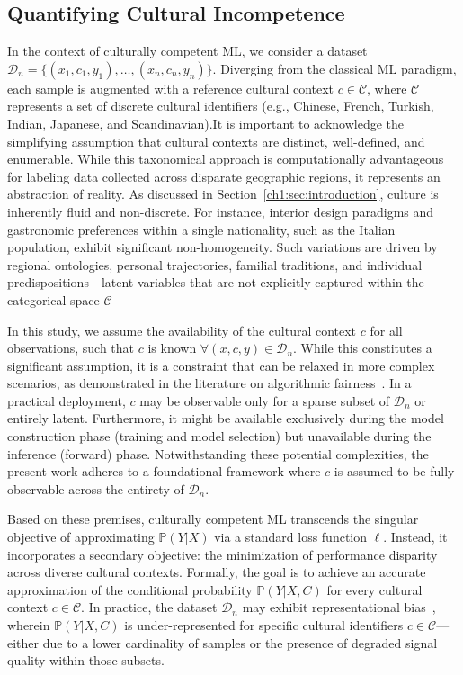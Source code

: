 \subsection{Quantifying Cultural Incompetence}
\label{ch2:sec:CCML}
In the context of culturally competent ML, we consider a dataset $\mathcal{D}_n = \{ (x_1, c_1, y_1), \dots, (x_n, c_n, y_n) \}$. 
Diverging from the classical ML paradigm, each sample is augmented with a reference cultural context $c \in \mathcal{C}$, where $\mathcal{C}$ represents a set of discrete cultural identifiers (e.g., Chinese, French, Turkish, Indian, Japanese, and Scandinavian).It is important to acknowledge the simplifying assumption that cultural contexts are distinct, well-defined, and enumerable. 
While this taxonomical approach is computationally advantageous for labeling data collected across disparate geographic regions, it represents an abstraction of reality. 
As discussed in Section~\ref{ch1:sec:introduction}, culture is inherently fluid and non-discrete. 
For instance, interior design paradigms and gastronomic preferences within a single nationality, such as the Italian population, exhibit significant non-homogeneity. 
Such variations are driven by regional ontologies, personal trajectories, familial traditions, and individual predispositions—latent variables that are not explicitly captured within the categorical space $\mathcal{C}$

In this study, we assume the availability of the cultural context $c$ for all observations, such that $c$ is known $\forall (x, c, y) \in \mathcal{D}_n$. 
While this constitutes a significant assumption, it is a constraint that can be relaxed in more complex scenarios, as demonstrated in the literature on algorithmic fairness~\citep{survey_fairness_wreprbias,oneto2019taking}.
In a practical deployment, $c$ may be observable only for a sparse subset of $\mathcal{D}_n$ or entirely latent. 
Furthermore, it might be available exclusively during the model construction phase (training and model selection) but unavailable during the inference (forward) phase. 
Notwithstanding these potential complexities, the present work adheres to a foundational framework where $c$ is assumed to be fully observable across the entirety of $\mathcal{D}_n$.

Based on these premises, culturally competent ML transcends the singular objective of approximating $\mathbb{P}(Y|X)$ via a standard loss function $\ell$. Instead, it incorporates a secondary objective: the minimization of performance disparity across diverse cultural contexts. 
Formally, the goal is to achieve an accurate approximation of the conditional probability $\mathbb{P}(Y|X, C)$ for every cultural context $c \in \mathcal{C}$.
In practice, the dataset $\mathcal{D}_n$ may exhibit representational bias~\citep{not_uniform_data}, wherein $\mathbb{P}(Y|X, C)$ is under-represented for specific cultural identifiers $c \in \mathcal{C}$—either due to a lower cardinality of samples or the presence of degraded signal quality within those subsets. 

